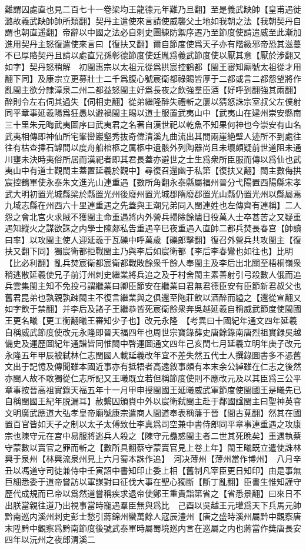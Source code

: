 難謂囚處直也見二百七十一卷梁均王龍德元年難乃旦翻】至是義武缺帥【皇甫遇徙潞故義武缺帥帥所類翻】契丹主遣使來言請使威襲父土地如我朝之法【我朝契丹自謂也朝直遥翻】帝辭以中國之法必自刺史團練防禦序遷乃至節度使請遣威至此漸加進用契丹主怒復遣使來言曰【復扶又翻】爾自節度使爲天子亦有階級邪帝恐其滋蔓不已厚賂契丹且請以處直兄孫彰德節度使廷胤爲義武節度使以厭其意【厭於涉翻又如字】契丹怒稍解　初閩惠宗以太祖元從爲拱宸控鶴都【閩王審知廟號太祖從才用翻下同】及康宗立更募壯士二千爲腹心號宸衛都祿賜皆厚于二都或言二都怨望將作亂閩主欲分隸漳泉二州二都益怒閩主好爲長夜之飲強羣臣酒【好呼到翻強其兩翻】醉則令左右伺其過失【伺相吏翻】從弟繼隆醉失禮斬之屢以猜怒誅宗室叔父左僕射同平章事延羲陽爲狂愚以避禍閩主賜以道士服置武夷山中【武夷山在建州崇安縣南三十里朱元晦武夷圖序曰武夷君之名著自漢世祀以乾魚不知果何神也今崇安有山名武夷相傳即神仙所宅峯巒巖壑秀抜奇偉清溪九曲流出其間兩崖絶壁人迹所不到處往往有枯查挿石罅間以度舟船棺柩之属柩中遺骸外列陶器尚且未壞頗疑前世道阻未通川壅未決時夷俗所居而漢祀者即其君長蓋亦避世之士生爲衆所臣服而傳以爲仙也武夷山中有道士觀閩主蓋置延羲於觀中】尋復召還幽于私第【復扶又翻】閩主數侮拱宸控鶴軍使永泰朱文進光山連重遇【數所角翻永泰縣屬福州晉分弋陽置西陽縣宋孝武大明初置光城縣梁於縣置光州後廢州置光城郡隋廢郡置光山縣仍置光州以縣屬焉九域志縣在州西六十里連重遇之先蓋與王潮兄弟同入閩連姓也左傳齊有連稱】二人怨之會北宫火求賊不獲閩主命重遇將内外營兵掃除餘燼日役萬人士卒甚苦之又疑重遇知縱火之謀欲誅之内學士陳郯私吿重遇辛巳夜重遇入直帥二都兵焚長春宫【帥讀曰率】以攻閩主使人迎延羲于瓦礫中呼萬歲【礫郎擊翻】復召外營兵共攻閩主【復扶又翻下同】獨宸衛都拒戰閩主乃與李后如宸衛都【李后李春鸞也如往也】比明【比必利翻】亂兵焚宸衛都宸衛都戰敗餘衆千餘人奉閩主及李后出北關至梧桐嶺衆稍逃散延羲使兄子前汀州刺史繼業將兵追之及于村舍閩主素善射引弓殺數人俄而追兵雲集閩主知不免投弓謂繼業曰卿臣節安在繼業曰君無君德臣安有臣節新君叔父也舊君昆弟也孰親孰疎閩主不復言繼業與之俱還至陁莊飲以酒醉而縊之【還從宣翻又如字飲于禁翻】并李后及諸子王繼恭皆死宸衛餘衆奔吳越延羲自稱威武節度使閩國王更名曦【更工衡翻曦王審知少子也】改元永隆　【考異曰十國紀年通文四年延羲自稱威武節度使改元永隆即晉天福四年也周世宗寶錄薛史唐餘錄南唐烈祖實録吳越備史及運歷圖紀年通譜皆同惟閩中啓運圖通文四年己亥閏七月延羲立明年庚子改元永隆五年甲辰被弑林仁志閩國人載延羲改年宜不差失然五代士人撰錄圖書多不憑舊文出于記憶及傳聞雖本國近事亦有抵牾者高遠敘事頗有本末余公綽雖在仁志之後然亦閩人故不敢獨從仁志所記又王曦既立若但稱節度使則不應改元及以其臣爲三公平章事按晉高祖實錄天福五年十一月甲申授閩國王延曦威武軍節度使閩國王是曦先已自稱閩國王紀年脱漏耳】赦繫囚頒賚中外以宸衛弑閩主赴于鄰國諡閩主曰聖神英睿文明廣武應道大弘孝皇帝廟號康宗遣商人間道奉表稱藩于晉【間古莧翻】然其在國置百官皆如天子之制以太子太傅致仕李真爲司空兼中書侍郎同平章事連重遇之攻康宗也陳守元在宫中易服將逃兵人殺之【陳守元蠱惑閩主者二世其死晩矣】重遇執蔡守蒙數以賣官之罪而斬之【數所具翻蔡守蒙賣官見上卷上年】閩王曦既立遣使誅林興于泉州【林興流泉州見上六月蜀本誅作追】　河决薄州【薄州當作博州】　八月辛丑以馮道守司徒兼侍中壬寅詔中書知印止委上相【舊制凡宰臣更日知印】由是事無巨細悉委于道帝嘗訪以軍謀對曰征伐大事在聖心獨斷【斷丁亂翻】臣書生惟知謹守歷代成規而已帝以爲然道嘗稱疾求退帝使鄭王重貴詣第省之【省悉景翻】曰來日不出朕當親往道乃出視事當時寵遇羣臣無與爲比　己酉以吳越王元瓘爲天下兵馬元帥　黔南巡内溪州刺史彭士愁引蔣錦州蠻萬餘人寇辰澧州【唐之盛時溪州屬黔中觀察唐末陞黔中觀察爲黔南節度後號武泰軍時屬蜀境廵内言在巡屬之内也蔣當作奬唐長安四年以沅州之夜郎渭溪二